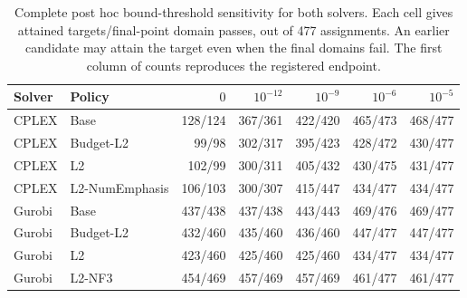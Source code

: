 \begin{table}[htbp]
\centering\small\setlength{\tabcolsep}{4pt}
\caption{Complete post hoc bound-threshold sensitivity for both solvers. Each
cell gives attained targets/final-point domain passes, out of 477 assignments.
An earlier candidate may attain the target even when the final domains fail.
The first column of counts reproduces the registered endpoint.}
\label{tab:orf-large-sensitivity-full}
\begin{tabular}{llrrrrr}\toprule
Solver & Policy & $0$ & $10^{-12}$ & $10^{-9}$ & $10^{-6}$ & $10^{-5}$\\\midrule
CPLEX & Base & 128/124 & 367/361 & 422/420 & 465/473 & 468/477\\
CPLEX & Budget-L2 & 99/98 & 302/317 & 395/423 & 428/472 & 430/477\\
CPLEX & L2 & 102/99 & 300/311 & 405/432 & 430/475 & 431/477\\
CPLEX & L2-NumEmphasis & 106/103 & 300/307 & 415/447 & 434/477 & 434/477\\
Gurobi & Base & 437/438 & 437/438 & 443/443 & 469/476 & 469/477\\
Gurobi & Budget-L2 & 432/460 & 435/460 & 436/460 & 447/477 & 447/477\\
Gurobi & L2 & 423/460 & 425/460 & 425/460 & 434/477 & 434/477\\
Gurobi & L2-NF3 & 454/469 & 457/469 & 457/469 & 461/477 & 461/477\\
\bottomrule\end{tabular}\end{table}
